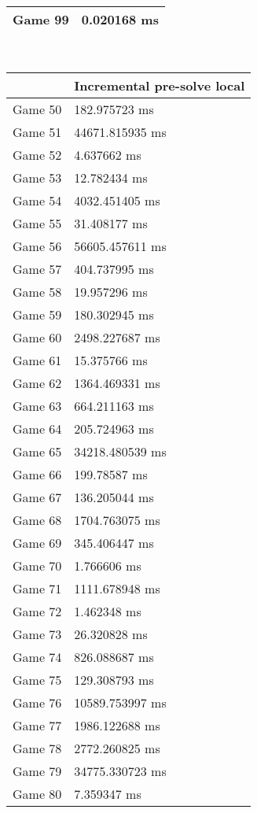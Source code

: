 \begin{multicols}{2}
\begin{tabular}{|l|l|}
	Game 99 & 0.020168 ms \\ \hline
\end{tabular}\\
\begin{tabular}{|l|l|}
	\hline
	& Incremental pre-solve local \\ \hline
	Game 50 & 182.975723 ms \\ \hline
	Game 51 & 44671.815935 ms \\ \hline
	Game 52 & 4.637662 ms \\ \hline
	Game 53 & 12.782434 ms \\ \hline
	Game 54 & 4032.451405 ms \\ \hline
	Game 55 & 31.408177 ms \\ \hline
	Game 56 & 56605.457611 ms \\ \hline
	Game 57 & 404.737995 ms \\ \hline
	Game 58 & 19.957296 ms \\ \hline
	Game 59 & 180.302945 ms \\ \hline
	Game 60 & 2498.227687 ms \\ \hline
	Game 61 & 15.375766 ms \\ \hline
	Game 62 & 1364.469331 ms \\ \hline
	Game 63 & 664.211163 ms \\ \hline
	Game 64 & 205.724963 ms \\ \hline
	Game 65 & 34218.480539 ms \\ \hline
	Game 66 & 199.78587 ms \\ \hline
	Game 67 & 136.205044 ms \\ \hline
	Game 68 & 1704.763075 ms \\ \hline
	Game 69 & 345.406447 ms \\ \hline
	Game 70 & 1.766606 ms \\ \hline
	Game 71 & 1111.678948 ms \\ \hline
	Game 72 & 1.462348 ms \\ \hline
	Game 73 & 26.320828 ms \\ \hline
	Game 74 & 826.088687 ms \\ \hline
	Game 75 & 129.308793 ms \\ \hline
	Game 76 & 10589.753997 ms \\ \hline
	Game 77 & 1986.122688 ms \\ \hline
	Game 78 & 2772.260825 ms \\ \hline
	Game 79 & 34775.330723 ms \\ \hline
	Game 80 & 7.359347 ms \\ \hline

\end{tabular}
\end{multicols}
